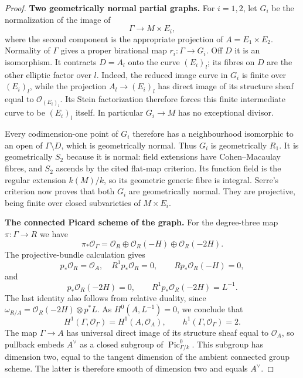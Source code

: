 \begin{proof}
\par\smallskip\noindent\textbf{Two geometrically normal partial graphs.}\quad
For $i=1,2$, let $G_i$ be the normalization of the image of
\[
       \Gamma\longrightarrow M\times E_i,
\]
where the second component is the appropriate projection of
$A=E_1\times E_2$.  Normality of $\Gamma$ gives a proper
birational map $r_i:\Gamma\to G_i$.  Off $D$ it is an
isomorphism.  It contracts $D=A_l$ onto the curve $(E_i)_l$;
its fibres on $D$ are the other elliptic factor over $l$.
Indeed, the reduced image curve in $G_i$ is finite over
$(E_i)_l$, while the projection $A_l\to(E_i)_l$ has direct
image of its structure sheaf equal to $\mathcal O_{(E_i)_l}$.
Its Stein factorization therefore forces this finite
intermediate curve to be $(E_i)_l$ itself.
In particular $G_i\to M$ has no
exceptional divisor.

Every codimension-one point of $G_i$ therefore has a
neighbourhood isomorphic to an open of $\Gamma\setminus D$,
which is geometrically normal.  Thus $G_i$ is geometrically
$R_1$.  It is geometrically $S_2$ because it is normal:
field extensions have Cohen--Macaulay fibres, and $S_2$
ascends by the cited flat-map criterion.  Its function field
is the regular extension $k(M)/k$, so its geometric generic
fibre is integral.  Serre's criterion now proves that both
$G_i$ are geometrically normal.  They are projective, being
finite over closed subvarieties of $M\times E_i$.

\par\smallskip\noindent\textbf{The connected Picard scheme of the graph.}\quad
For the degree-three map $\pi:\Gamma\to R$ we have
\[
 \pi_*\mathcal O_\Gamma
 =\mathcal O_R\oplus\mathcal O_R(-H)\oplus\mathcal O_R(-2H).
\]
The projective-bundle calculation gives
\[
 p_*\mathcal O_R=\mathcal O_A,\quad R^1p_*\mathcal O_R=0,
 \qquad Rp_*\mathcal O_R(-H)=0,
\]
and
\[
 p_*\mathcal O_R(-2H)=0,\qquad
 R^1p_*\mathcal O_R(-2H)=L^{-1}.
\]
The last identity also follows from relative duality, since
$\omega_{R/A}=\mathcal O_R(-2H)\otimes p^*L$.
As $H^0(A,L^{-1})=0$, we conclude that
\[
 H^1(\Gamma,\mathcal O_\Gamma)=H^1(A,\mathcal O_A),
 \qquad h^1(\Gamma,\mathcal O_\Gamma)=2.
\]
The map $\Gamma\to A$ has universal direct image of its
structure sheaf equal to $\mathcal O_A$, so pullback embeds
$A^\vee$ as a closed subgroup of $\operatorname{Pic}^0_{\Gamma/k}$.
This subgroup has dimension two, equal to the tangent dimension
of the ambient connected group scheme.  The latter is therefore
smooth of dimension two and equals $A^\vee$.


\end{proof}
